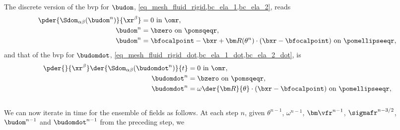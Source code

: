The discrete version of  the \ac{bvp} for $\budom$, \cref{eq_mesh_fluid_rigid,bc_ela_1,bc_ela_2}, reads
\begin{align}
        \label{eq_domain_fluid_rigid_disc}
        \pder{\Sdom_{\alpha \beta}(\budom^n)}{\xr^\beta} & = 0 \text{ in } \omr,                                                                            \\
        \label{bc_ela_1_disc}
        \budom^n                                         & =\bzero \text{ on } \pomsqeqr,                                                                   \\
        \label{bc_ela_2_disc}
        \budom^n                                         & = \bfocalpoint - \bxr + {\bm R}(\theta^n)\cdot (\bxr - \bfocalpoint) \text{ on } \pomellipseeqr,
\end{align}
and that of the \ac{bvp} for $\budomdot$, \cref{eq_mesh_fluid_rigid_dot,bc_ela_1_dot,bc_ela_2_dot}, is
\begin{align}
        \label{eq_domain_fluid_rigid_disc_dot}
        \pder{}{\xr^\beta}\der{\Sdom_{\alpha \beta}(\budomdot^n)}{t} & = 0 \text{ in } \omr,                                                                  \\
        \label{bc_ela_1_disc_dot}
        \budomdot  ^n                                                & =\bzero \text{ on } \pomsqeqr,                                                         \\
        \label{bc_ela_2_disc_dot}
        \budomdot  ^n                                                & =  \omega \der{{\bm R}}{\theta}\cdot (\bxr - \bfocalpoint) \text{ on } \pomellipseeqr,
\end{align}\vspace{0.5cm}\\

We can now iterate in time for the ensemble of fields as follows. At each step $n$, given $\theta^{n-1}$, $\omega^{n-1}$, ${\bm \vfr}^{n-1}$, $\sigmafr^{n-3/2}$, $\budom^{n-1}$ and $\budomdot^{n-1}$ from the preceding step, we
\begin{enumerate}
\end{enumerate}


